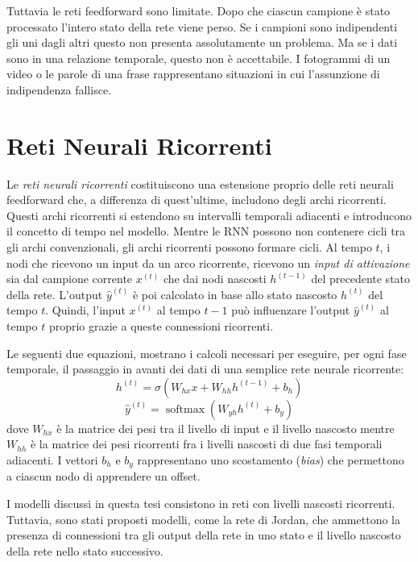 Tuttavia le reti feedforward sono limitate. Dopo che ciascun campione \`e stato
processato l'intero stato della rete viene perso. Se i campioni sono indipendenti
gli uni dagli altri questo non presenta assolutamente un problema. Ma se i dati
sono in una relazione temporale, questo non \`e accettabile. I fotogrammi di un
video o le parole di una frase rappresentano situazioni in cui l'assunzione di
indipendenza fallisce.

\section{Reti Neurali Ricorrenti}

Le \emph{reti neurali ricorrenti} costituiscono una estensione proprio delle reti
neurali feedforward che, a differenza di quest'ultime, includono degli archi ricorrenti.
Questi archi ricorrenti si estendono su intervalli temporali adiacenti e introducono
il concetto di tempo nel modello. Mentre le RNN possono non contenere cicli tra
gli archi convenzionali, gli archi ricorrenti possono formare cicli. Al tempo $t$,
i nodi che ricevono un input da un arco ricorrente, ricevono un \emph{input di
attivazione} sia dal campione corrente $x^{(t)}$ che dai nodi nascosti $h^{(t-1)}$
del precedente stato della rete. L'output $\hat{y}^{(t)}$ \`e poi calcolato in
base allo stato nascosto $h^{(t)}$ del tempo $t$. Quindi, l'input $x^{(t)}$ al
tempo $t-1$ pu\`o influenzare l'output $\hat{y}^{(t)}$ al tempo $t$ proprio grazie
a queste connessioni ricorrenti.

Le seguenti due equazioni, mostrano i calcoli necessari per eseguire, per ogni
fase temporale, il passaggio in avanti dei dati di una semplice rete neurale
ricorrente:
\begin{equation}
  h^{(t)} = \sigma(W_{hx}x + W_{hh}h^{(t-1)} + b_h)
\end{equation}
\begin{equation}
  \hat{y}^{(t)} = \operatorname{softmax}(W_{yh}h^{(t)} + b_y)
\end{equation}
dove $W_{hx}$ \`e la matrice dei pesi tra il livello di input e il livello nascosto
mentre $W_{hh}$ \`e la matrice dei pesi ricorrenti fra i livelli nascosti di due
fasi temporali adiacenti. I vettori $b_h$ e $b_y$ rappresentano uno scostamento
(\emph{bias}) che permettono a ciascun nodo di apprendere un offset.

I modelli discussi in questa tesi consistono in reti con livelli nascosti ricorrenti.
Tuttavia, sono stati proposti modelli, come la rete di Jordan, che ammettono la
presenza di connessioni tra gli output della rete in uno stato e il livello nascosto
della rete nello stato successivo.

